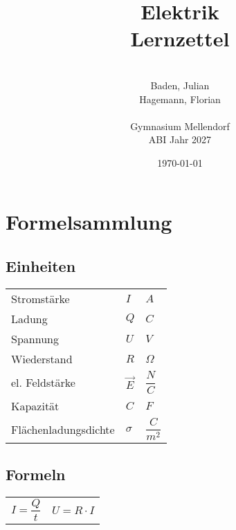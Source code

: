 \documentclass[a4paper]{article}
\title{\Huge{Elektrik\\Lernzettel}}
\date{\today}
\author{\quad\\Baden, Julian\\Hagemann, Florian\\\quad\\Gymnasium Mellendorf\\ABI Jahr 2027}
\begin{document}
\maketitle
\thispagestyle{empty}
\newpage
\tableofcontents \thispagestyle{empty}
\newpage
{}


\section{Formelsammlung}
\subsection{Einheiten}

\begin{center}
    \begin{tabular}{ p{4cm} p{4cm} p{4cm} }
         Stromstärke            & $I$           & $A$                 \\[0,5cm]
         Ladung                 & $Q$           & $C$                 \\[0,5cm]
         Spannung               & $U$           & $V$                 \\[0,5cm]
         Wiederstand            & $R$           & $\Omega$            \\[0,5cm]
         el. Feldstärke         & $\vec{E}$     & $\dfrac{N}{C}$      \\[0,5cm]
         Kapazität              & $C$           & $F$                 \\[0,5cm]
         Flächenladungsdichte   & $\sigma$      & $\dfrac{C}{m^2}$    \\[1cm]
    \end{tabular}
\end{center}


\subsection{Formeln}

\Large
\begin{center} 
    \begin{tabular}{ c c }
        $I = \dfrac{Q}{t}$ \hspace{2cm} &  $U = R \cdot I$    \\[1cm]
    \end{tabular}
\end{center} 
\normalsize
\end{document}
